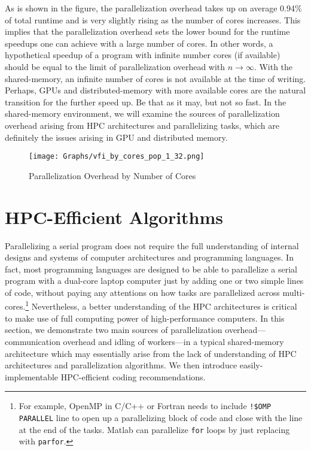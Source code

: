 \documentclass[12pt]{article}
\begin{document}
As is shown in the figure, the parallelization overhead takes up on average 0.94\% of total runtime and is very slightly rising as the number of cores increases. This implies that the parallelization overhead sets the lower bound for the runtime speedups one can achieve with a large number of cores. In other words, a hypothetical speedup of a program with infinite number cores (if available) should be equal to the limit of parallelization overhead with $n\rightarrow\infty$. With the shared-memory, an infinite number of cores is not available at the time of writing. Perhaps, GPUs and distributed-memory with more available cores are the natural transition for the further speed up. Be that as it may, but not so fast. In the shared-memory environment, we will examine the sources of parallelization overhead arising from HPC architectures and parallelizing tasks, which are definitely the issues arising in GPU and distributed memory.
\begin{figure}[t!]
\sf
\begin{center}
\caption{\sf Parallelization Overhead by Number of Cores}
\texttt{[image: Graphs/vfi\_by\_cores\_pop\_1\_32.png]}\label{fig:runtime_cores_pop_1_32}
\end{center}
\end{figure}






\clearpage
\section{HPC-Efficient Algorithms}
Parallelizing a serial program does not require the full understanding of internal designs and systems of computer architectures and programming languages. In fact, most programming languages are designed to be able to parallelize a serial program with a dual-core laptop computer just by adding one or two simple lines of code, without paying any attentions on how tasks are parallelized across multi-cores.\footnote{\sf For example, OpenMP in C/C++ or Fortran needs to include \texttt{!\$OMP PARALLEL} line to open up a parallelizing block of code and close with the line at the end of the tasks. Matlab can parallelize \texttt{for} loops by just replacing with \texttt{parfor}.} Nevertheless, a better understanding of the HPC architectures is critical to make use of full computing power of high-performance computers. In this section, we demonstrate two main sources of parallelization overhead---communication overhead and idling of workers---in a typical shared-memory architecture which may essentially arise from the lack of understanding of HPC architectures and parallelization algorithms. We then introduce easily-implementable HPC-efficient coding recommendations.
\end{document}
